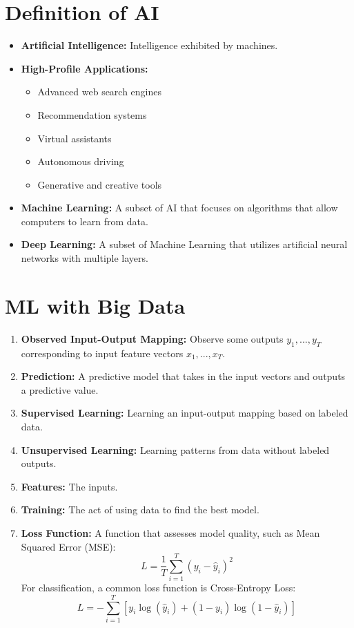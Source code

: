 \documentclass{article}
\begin{document}
\section{Definition of AI}
\begin{itemize}
  \item \textbf{Artificial Intelligence:} Intelligence exhibited by machines.
  \item \textbf{High-Profile Applications:}
  \begin{itemize}
    \item Advanced web search engines
    \item Recommendation systems
    \item Virtual assistants
    \item Autonomous driving
    \item Generative and creative tools
  \end{itemize}
  \item \textbf{Machine Learning:} A subset of AI that focuses on algorithms that allow computers to learn from data.
  \item \textbf{Deep Learning:} A subset of Machine Learning that utilizes artificial neural networks with multiple layers.
\end{itemize}

\section{ML with Big Data}
\begin{enumerate}
  \item \textbf{Observed Input-Output Mapping:} Observe some outputs $y_1, ... , y_T$ corresponding to input feature vectors $x_1, ..., x_T$.
  \item \textbf{Prediction:} A predictive model that takes in the input vectors and outputs a predictive value.
  \item \textbf{Supervised Learning:} Learning an input-output mapping based on labeled data.
  \item \textbf{Unsupervised Learning:} Learning patterns from data without labeled outputs.
  \item \textbf{Features:} The inputs.
  \item \textbf{Training:} The act of using data to find the best model.
  \item \textbf{Loss Function:} A function that assesses model quality, such as Mean Squared Error (MSE):
        \begin{equation}
        L = \frac{1}{T} \sum_{i=1}^{T} (y_i - \hat{y}_i)^2
        \end{equation}
        For classification, a common loss function is Cross-Entropy Loss:
        \begin{equation}
        L = -\sum_{i=1}^{T} \left[ y_i \log(\hat{y}_i) + (1 - y_i) \log(1 - \hat{y}_i) \right]
        \end{equation}
\end{enumerate}
\end{document}
